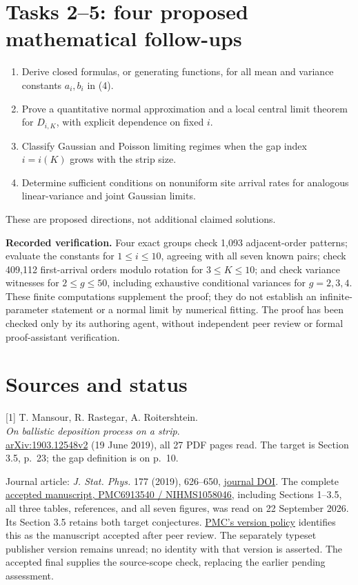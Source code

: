 \documentclass[11pt]{article}
\begin{document}
\section*{Tasks 2--5: four proposed mathematical follow-ups}
\begin{enumerate}[label=\textbf{Task \arabic*:},start=2,leftmargin=*]
\item Derive closed formulas, or generating functions, for all
mean and variance constants \(a_i,b_i\) in (4).
\item Prove a quantitative normal approximation and a local central
limit theorem for \(D_{i,K}\), with explicit dependence on fixed \(i\).
\item Classify Gaussian and Poisson limiting regimes when the gap
index \(i=i(K)\) grows with the strip size.
\item Determine sufficient conditions on nonuniform site arrival
rates for analogous linear-variance and joint Gaussian limits.
\end{enumerate}
These are proposed directions, not additional claimed solutions.

\noindent\textbf{Recorded verification.}
Four exact groups check 1,093 adjacent-order patterns; evaluate
the constants for \(1\leq i\leq10\), agreeing with all seven known
pairs; check 409,112 first-arrival orders modulo rotation for
\(3\leq K\leq10\); and check variance witnesses for \(2\leq g\leq50\),
including exhaustive conditional variances for \(g=2,3,4\).
These finite computations supplement the proof; they do not establish
an infinite-parameter statement or a normal limit by numerical fitting.
The proof has been checked only by its authoring agent, without
independent peer review or formal proof-assistant verification.

\section*{Sources and status}
[1] T. Mansour, R. Rastegar, A. Roitershtein.\\
\emph{On ballistic deposition process on a strip}.\\
\href{https://arxiv.org/abs/1903.12548}{arXiv:1903.12548v2}
(19 June 2019), all 27 PDF pages read.
The target is Section 3.5, p.~23; the gap definition is on p.~10.
\par\smallskip\noindent Journal article: \emph{J. Stat. Phys.} 177 (2019), 626--650,
\href{https://doi.org/10.1007/s10955-019-02383-4}
{journal DOI}. The complete
\href{https://pmc.ncbi.nlm.nih.gov/articles/PMC6913540/}{accepted manuscript,
PMC6913540 / NIHMS1058046}, including Sections 1--3.5, all three tables,
references, and all seven figures, was read on 22 September 2026.
Its Section 3.5 retains both target conjectures.
\href{https://pmc.ncbi.nlm.nih.gov/about/authorms/}{PMC's version policy}
identifies this as the manuscript accepted after peer review.
The separately typeset publisher version remains unread; no identity
with that version is asserted. The accepted final supplies the
source-scope check, replacing the earlier pending assessment.
\end{document}
